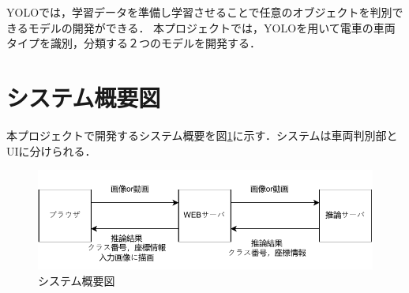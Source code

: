 YOLOでは，学習データを準備し学習させることで任意のオブジェクトを判別できるモデルの開発ができる．
本プロジェクトでは，YOLOを用いて電車の車両タイプを識別，分類する２つのモデルを開発する．
\section{システム概要図}
本プロジェクトで開発するシステム概要を図\ref{FIG}に示す．システムは車両判別部とUIに分けられる．\\

\begin{figure}
	\centering
	\includegraphics [width=\linewidth]{fig/system.pdf}
	\caption{システム概要図}
	\label{FIG}
\end{figure}







